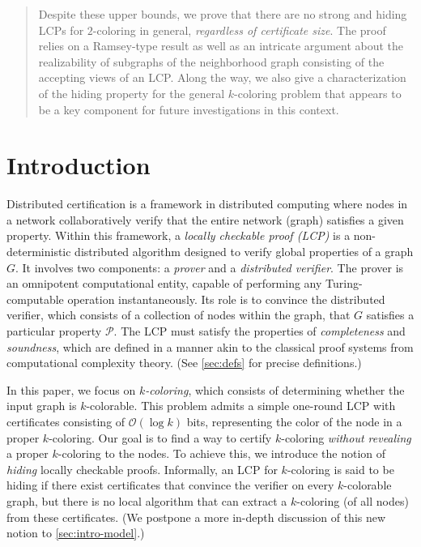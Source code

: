 \documentclass[11pt]{article}
\newcommand*{\cO}{\mathcal{O}}
\begin{document}
\begin{abstract}
Despite these upper bounds, we prove that there are no strong and hiding LCPs
for $2$-coloring in general, \emph{regardless of certificate size}. 
The proof relies on a Ramsey-type result as well as an intricate argument about
the realizability of subgraphs of the neighborhood graph consisting of the
accepting views of an LCP.
Along the way, we also give a characterization of the hiding property for the
general $k$-coloring problem that appears to be a key component for future
investigations in this context.

\end{abstract}

\clearpage %
\thispagestyle{plain}

\section{Introduction}


Distributed certification is a framework in distributed computing where nodes in a network collaboratively verify that the entire network (graph) satisfies a given property. Within this framework, a \emph{locally checkable proof (LCP)} is a non-deterministic distributed algorithm designed to verify global properties of a graph \( G \). It involves two components: a \emph{prover} and a \emph{distributed verifier}. The prover is an omnipotent computational entity, capable of performing any Turing-computable operation instantaneously. Its role is to convince the distributed verifier, which consists of a collection of nodes within the graph, that \( G \) satisfies a particular property \( \mathcal{P} \).
The LCP must satisfy the properties of \emph{completeness} and \emph{soundness},
which are defined in a manner akin to the classical proof systems from
computational complexity theory.
(See \cref{sec:defs} for precise definitions.)

In this paper, we focus on \emph{$k$-coloring}, which consists of determining whether the input graph is $k$-colorable. This problem admits a simple one-round LCP with certificates consisting of $\cO(\log k)$ bits, representing the color of the node in a proper $k$-coloring. Our goal is to find a way to certify $k$-coloring \emph{without revealing} a proper $k$-coloring to the nodes. To achieve this, we introduce the notion of \emph{hiding} locally checkable proofs.
Informally, an LCP for $k$-coloring is said to be hiding if there exist
certificates that convince the verifier on every $k$-colorable graph, but there
is no local algorithm that can extract a $k$-coloring (of all nodes) from these
certificates.
(We postpone a more in-depth discussion of this new notion to
\cref{sec:intro-model}.)
\end{document}
